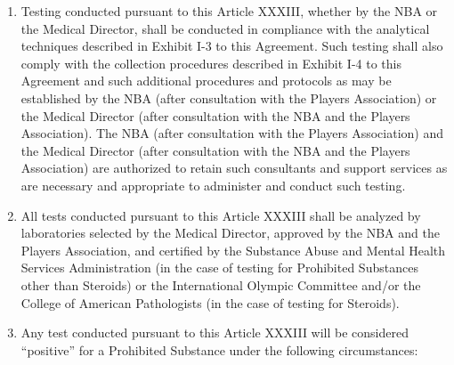 \documentclass[
]{book}
\providecommand{\tightlist}{%
  \setlength{\itemsep}{0pt}\setlength{\parskip}{0pt}}
\begin{document}
\begin{enumerate}
\def\labelenumi{(\alph{enumi})}
\tightlist
\item
  Testing conducted pursuant to this Article XXXIII, whether by the NBA or the Medical Director, shall be conducted in compliance with the analytical techniques described in Exhibit I-3 to this Agreement. Such testing shall also comply with the collection procedures described in Exhibit I-4 to this Agreement and such additional procedures and protocols as may be established by the NBA (after consultation with the Players Association) or the Medical Director (after consultation with the NBA and the Players Association). The NBA (after consultation with the Players Association) and the Medical Director (after consultation with the NBA and the Players Association) are authorized to retain such consultants and support services as are necessary and appropriate to administer and conduct such testing.
\item
  All tests conducted pursuant to this Article XXXIII shall be analyzed by laboratories selected by the Medical Director, approved by the NBA and the Players Association, and certified by the Substance Abuse and Mental Health Services Administration (in the case of testing for Prohibited Substances other than Steroids) or the International Olympic Committee and/or the College of American Pathologists (in the case of testing for Steroids).
\item
  Any test conducted pursuant to this Article XXXIII will be considered ``positive'' for a Prohibited Substance under the following circumstances:


\end{enumerate}
\end{document}
